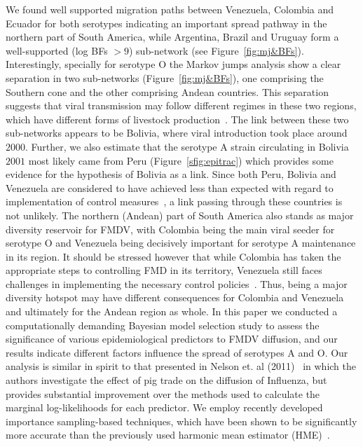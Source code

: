 \documentclass[10pt]{article}
\begin{document}
We found well supported migration paths between Venezuela, Colombia and Ecuador for both serotypes indicating an important spread pathway in the northern part of South America, while Argentina, Brazil and Uruguay form a well-supported (log BFs $> 9$) sub-network (see Figure~\ref{fig:mj&BFs}).
Interestingly, specially for serotype O the Markov jumps analysis show a clear separation in two sub-networks (Figure~\ref{fig:mj&BFs}), one comprising the Southern cone and the other comprising Andean countries.
This separation suggests that viral transmission may follow different regimes in these two regions, which have different forms of livestock production~\cite{Saraiva2003,Naranjo2013}.
The link between these two sub-networks appears to be Bolivia, where viral introduction took place around $2000$. 
Further, we also estimate that the serotype A strain circulating in Bolivia $2001$ most likely came from Peru (Figure~\ref{sfig:epitrac}) which provides some evidence for the hypothesis of Bolivia as a link.
Since both Peru, Bolivia and Venezuela are considered to have achieved less than expected with regard to implementation of control measures~\cite{Naranjo2013}, a link passing through these countries is not unlikely.
The northern (Andean) part of South America also stands as major diversity reservoir for FMDV, with Colombia being the main viral seeder for serotype O and Venezuela being decisively important for serotype A maintenance in its region.
It should be stressed however that while Colombia has taken the appropriate steps to controlling FMD in its territory, Venezuela still faces challenges in implementing the necessary control policies~\cite{Naranjo2013}.
Thus, being a major diversity hotspot may have different consequences for Colombia and Venezuela and ultimately for the Andean region as whole.
In this paper we conducted a computationally demanding Bayesian model selection study to assess the significance of various epidemiological predictors to FMDV diffusion, and our results indicate different factors influence the spread of serotypes A and O.
Our analysis is similar in spirit to that presented in Nelson et. al (2011)~\cite{Nelson2011} in which the authors investigate the effect of pig trade on the diffusion of Influenza, but provides substantial improvement over the methods used to calculate the marginal log-likelihoods for each predictor.
We employ recently developed importance sampling-based techniques, which have been shown to be significantly more accurate than the previously used harmonic mean estimator (HME)~\cite{Baele2012, Baele2013a, Baele2013b}.
\end{document}
